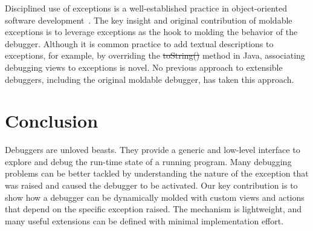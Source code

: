 \documentclass[sigplan,10pt]{acmart}
\begin{document}
Disciplined use of exceptions is a well-established practice in object-oriented software development~\cite{Meye88a}.
The key insight and original contribution of moldable exceptions is to leverage exceptions as the hook to molding the behavior of the debugger.
Although it is common practice to add textual descriptions to exceptions, for example, by overriding the \st{toString()} method in Java, associating debugging views to exceptions is novel.
No previous approach to extensible debuggers, including the original moldable debugger, has taken this approach.

\section{Conclusion}\label{sec:conclusion}


Debuggers are unloved beasts.
They provide a generic and low-level interface to explore and debug the run-time state of a running program.
Many debugging problems can be better tackled by understanding the nature of the exception that was raised and caused the debugger to be activated.
Our key contribution is to show how a debugger can be dynamically molded with custom views and actions that depend on the specific exception raised.
The mechanism is lightweight, and many useful extensions can be defined with minimal implementation effort.




\end{document}
